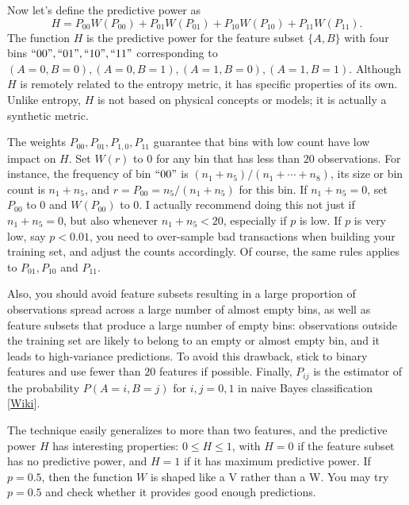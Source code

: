 \documentclass[oneside,10pt]{book}
\begin{document}
\noindent Now let’s define the \textcolor{index}{predictive power} as
$$
H = P_{00} W(P_{00}) + P_{01} W(P_{01}) + P_{10} W(P_{10}) + P_{11} W(P_{11}).
$$
The function $H$ is the predictive power for the feature subset $\{A, B\}$ with four bins $``00", ``01", ``10", ``11"$ corresponding to 
$(A = 0, B = 0), (A = 0, B = 1), (A = 1, B = 0), (A = 1, B = 1)$. Although $H$ is remotely related to the 
\textcolor{index}{entropy metric}, it has specific properties of its own. Unlike entropy, $H$ is not based on physical concepts or models; it is actually a \textcolor{index}{synthetic metric}.


The weights $P_{00},P_{01},P_{1,0},P_{11}$  guarantee that bins with low count  have low impact on $H$. Set $W(r)$ to $0$ for any bin that has less than $20$ observations. 
For instance, the frequency of bin $``00"$ is $(n_1 + n_5) / (n_1 +\cdots + n_8)$, its size or bin count is $n_1 + n_5$, and 
$r = P_{00} = n_5 / (n_1 + n_5)$ for this bin. If $n_1 + n_5 = 0$, set $P_{00}$ to $0$ and $W(P_{00})$ to 0. 
I actually recommend doing this not just if $n_1 + n_5 = 0$, but also whenever $n_1 + n_5 < 20$, especially if $p$ is low. If $p$ is very low, say $p < 0.01$, you need to over-sample bad transactions when building your training set, and adjust the counts accordingly. 
Of course, the same rules applies to $P_{01}, P_{10}$ and $P_{11}$. 

Also, you should avoid feature subsets resulting in a large proportion of observations spread across a large number of almost empty bins, as well as feature subsets that produce a large number of empty bins: observations outside the training set are likely to belong to an empty or almost empty bin, and it leads to high-variance predictions. To avoid this drawback, stick to binary features and use fewer than $20$ features if possible. 
Finally, $P_{ij}$  is the estimator of the probability $P(A = i, B = j)$ for $i, j = 0,1$ in 
\textcolor{index}{naive Bayes classification} [\href{https://en.wikipedia.org/wiki/Naive_Bayes_classifier}{Wiki}].


The technique easily generalizes to more than two features, and the predictive power $H$ has interesting properties: $0\leq H\leq 1$, with $H= 0$ if the feature subset has no predictive power, and $H=1$ if it has maximum predictive power. If  $p = 0.5$, then the function $W$ is shaped like a V rather than a W. You may try $p=0.5$ and check whether it provides good enough predictions.
\end{document}
